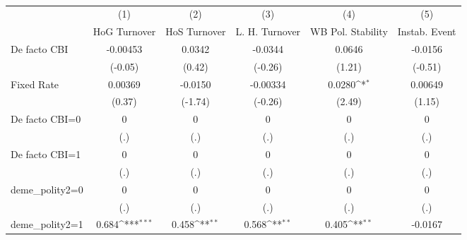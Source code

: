 \begin{table}[htbp]\centering
\def\sym#1{\ifmmode^{#1}\else\(^{#1}\)\fi}
\caption{\label{binarydemcmultIndFEDF}}
\begin{tabular}{l*{5}{c}}
\toprule
                                        &\multicolumn{1}{c}{(1)}&\multicolumn{1}{c}{(2)}&\multicolumn{1}{c}{(3)}&\multicolumn{1}{c}{(4)}&\multicolumn{1}{c}{(5)}\\
                                        &\multicolumn{1}{c}{HoG Turnover}&\multicolumn{1}{c}{HoS Turnover}&\multicolumn{1}{c}{L. H. Turnover}&\multicolumn{1}{c}{WB Pol. Stability}&\multicolumn{1}{c}{Instab. Event}\\
\midrule
De facto CBI                            & -0.00453         &   0.0342         &  -0.0344         &   0.0646         &  -0.0156         \\
                                        &  (-0.05)         &   (0.42)         &  (-0.26)         &   (1.21)         &  (-0.51)         \\
\addlinespace
Fixed Rate                              &  0.00369         &  -0.0150         & -0.00334         &   0.0280\sym{*}  &  0.00649         \\
                                        &   (0.37)         &  (-1.74)         &  (-0.26)         &   (2.49)         &   (1.15)         \\
\addlinespace
De facto CBI=0                          &        0         &        0         &        0         &        0         &        0         \\
                                        &      (.)         &      (.)         &      (.)         &      (.)         &      (.)         \\
\addlinespace
De facto CBI=1                          &        0         &        0         &        0         &        0         &        0         \\
                                        &      (.)         &      (.)         &      (.)         &      (.)         &      (.)         \\
\addlinespace
deme\_polity2=0                          &        0         &        0         &        0         &        0         &        0         \\
                                        &      (.)         &      (.)         &      (.)         &      (.)         &      (.)         \\
\addlinespace
deme\_polity2=1                          &    0.684\sym{***}&    0.458\sym{**} &    0.568\sym{**} &    0.405\sym{**} &  -0.0167         \\

\end{tabular}
\end{table}
